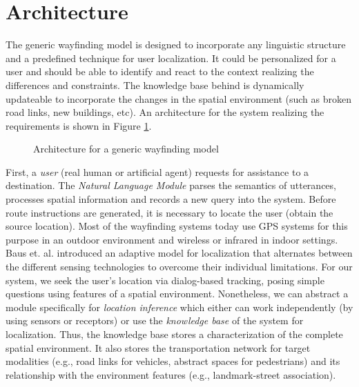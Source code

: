 \documentclass{iitkthesis}
\begin{document}
 \section{Architecture}
The generic wayfinding model is designed to incorporate any linguistic 
structure and a predefined technique for user localization. It could 
be personalized for a user and should be able to identify and react to 
the context realizing the differences and constraints. The knowledge base 
behind is dynamically updateable to incorporate 
the changes in the spatial environment (such as broken road links, new 
buildings, etc). An architecture for the system realizing the requirements is 
shown in Figure \ref{fig:arc}. 
 \begin{figure}
\centering
\caption{Architecture for a generic wayfinding model}
\label{fig:arc}
 \end{figure}
First, a \textit{user} (real human or artificial agent) requests for assistance 
to a destination. The \textit{Natural Language Module} parses the 
semantics of utterances, processes spatial information and records a new 
query into the system. Before route instructions are generated, it 
is necessary to locate the user (obtain the source location). Most of the 
wayfinding systems today use GPS systems for this purpose in an outdoor 
environment and wireless or infrared in indoor settings. Baus et. 
al. \cite{baus} introduced an adaptive model for localization that 
alternates between the different sensing technologies to overcome their 
individual limitations. For our system, we seek 
the user's location via dialog-based tracking, posing simple questions 
using features of a spatial environment. Nonetheless, we can abstract a 
module specifically for \textit{location inference} which either can work 
independently (by using sensors or receptors) or use the 
\textit{knowledge base} of the system for localization. Thus, the 
knowledge base stores a characterization of the complete spatial 
environment. It also stores the transportation network for target modalities 
(e.g., road links for vehicles, abstract spaces for pedestrians) and its 
relationship with the environment features (e.g., landmark-street 
association).
\end{document}
